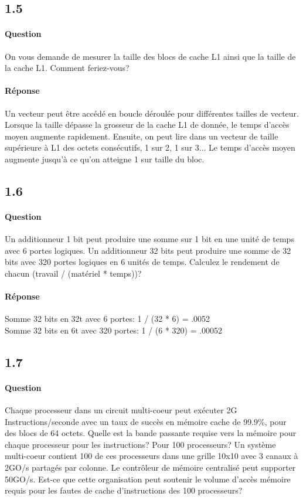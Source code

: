\documentclass[oneside]{book}
\begin{document}
\subsection{1.5}
\paragraph{Question}
On vous demande de mesurer la taille des blocs de cache L1 ainsi que la taille de
la cache L1. Comment feriez-vous?
\paragraph{Réponse}
Un vecteur peut être accédé en boucle déroulée pour différentes tailles de
vecteur. Lorsque la taille dépasse la grosseur de la cache L1 de donnée, le
temps d'accès moyen augmente rapidement. Ensuite, on peut lire dans un
vecteur de taille supérieure à L1 des octets consécutifs, 1 sur 2, 1 sur 3... Le
temps d'accès moyen augmente jusqu'à ce qu'on atteigne 1 sur taille du bloc.
\subsection{1.6}
\paragraph{Question}
Un additionneur 1 bit peut produire une somme sur 1 bit en une unité de temps
avec 6 portes logiques. Un additionneur 32 bits peut produire une somme de 32
bits avec 320 portes logiques en 6 unités de temps. Calculez le rendement de
chacun (travail / (matériel * temps))?
\paragraph{Réponse}
Somme 32 bits en 32t avec 6 portes: 1 / (32 * 6) = .0052\\
Somme 32 bits en 6t avec 320 portes: 1 / (6 * 320) = .00052
\subsection{1.7}
\paragraph{Question}
Chaque processeur dans un circuit multi-coeur peut exécuter 2G
Instructions/seconde avec un taux de succès en mémoire cache de 99.9\%, pour
des blocs de 64 octets. Quelle est la bande passante requise vers la mémoire
pour chaque processeur pour les instructions? Pour 100 processeurs? Un
système multi-coeur contient 100 de ces processeurs dans une grille 10x10 avec
3 canaux à 2GO/s partagés par colonne. Le contrôleur de mémoire centralisé peut
supporter 50GO/s. Est-ce que cette organisation peut soutenir le volume d'accès
mémoire requis pour les fautes de cache d'instructions des 100 processeurs?
\end{document}
